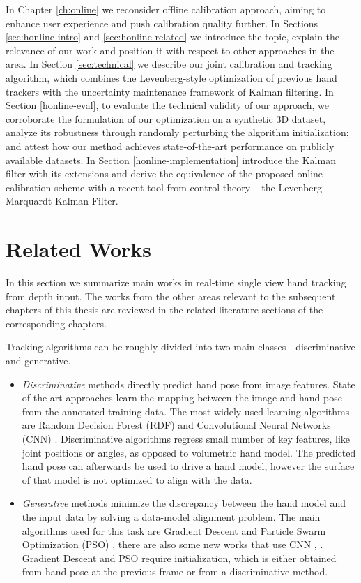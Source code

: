 In Chapter \ref{ch:online} we reconsider offline calibration approach, aiming to enhance user experience and push calibration quality further. In Sections \ref{sec:honline-intro} and \ref{sec:honline-related} we introduce the topic, explain the relevance of our work and position it with respect to other approaches in the area. In Section \ref{sec:technical} we describe our joint calibration and tracking algorithm, which combines the Levenberg-style optimization of previous hand trackers with the uncertainty maintenance framework of Kalman filtering. In Section \ref{honline-eval}, to evaluate the technical validity of our approach, we corroborate the formulation of our optimization on a synthetic 3D dataset, analyze its robustness through randomly perturbing the algorithm initialization; and attest how our method achieves state-of-the-art performance on publicly available datasets. In Section \ref{honline-implementation} introduce the Kalman filter with its extensions and derive the equivalence of the proposed online calibration scheme with a recent tool from control theory – the Levenberg-Marquardt Kalman Filter.

\section{Related Works}

In this section we summarize main works in real-time single view hand tracking from depth input. The works from the other areas relevant to the subsequent chapters of this thesis are reviewed in the related literature sections of the corresponding chapters. 

Tracking algorithms can be roughly divided into two main classes - discriminative and generative.
\vspace{-1.5em}
\begin{itemize}
\item \textit{Discriminative} methods directly predict hand pose from image features. State of the art approaches learn the mapping between the image and hand pose from the annotated training data. The most widely used learning algorithms are Random Decision Forest (RDF) \cite{keskin2012hand} and Convolutional Neural Networks (CNN) \cite{tompson2014real}. Discriminative algorithms regress small number of key features, like joint positions or angles, as opposed to volumetric hand model. The predicted hand pose can afterwards be used to drive a hand model, however the surface of that model is not optimized to align with the data. 
%
\item \textit{Generative} methods minimize the discrepancy between the hand model and the input data by solving a data-model alignment problem. The main algorithms used for this task are Gradient Descent \cite{taylor2016concerto} and Particle Swarm Optimization (PSO) \cite{oiko2011hand}, there are also some new works that use CNN \cite{simon2017hand}, \cite{zimmermann2017learning}. Gradient Descent and PSO require initialization, which is either obtained from hand pose at the previous frame or from a discriminative method.
\end{itemize}

